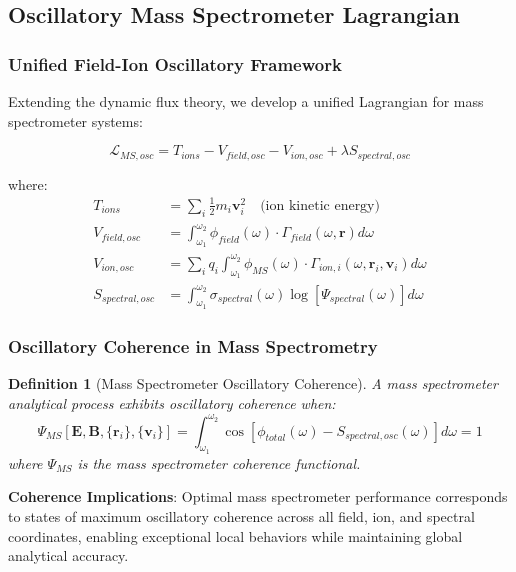 \documentclass[11pt,a4paper]{article}
\newtheorem{definition}[theorem]{Definition}
\theoremstyle{remark}
\begin{document}
\subsection{Oscillatory Mass Spectrometer Lagrangian}

\subsubsection{Unified Field-Ion Oscillatory Framework}

Extending the dynamic flux theory, we develop a unified Lagrangian for mass spectrometer systems:

\begin{equation}
\mathcal{L}_{MS,osc} = T_{ions} - V_{field,osc} - V_{ion,osc} + \lambda S_{spectral,osc}
\end{equation}

where:
\begin{align}
T_{ions} &= \sum_i \frac{1}{2}m_i \mathbf{v}_i^2 \quad \text{(ion kinetic energy)}\\
V_{field,osc} &= \int_{\omega_1}^{\omega_2} \phi_{field}(\omega) \cdot \Gamma_{field}(\omega, \mathbf{r}) d\omega\\
V_{ion,osc} &= \sum_i q_i \int_{\omega_1}^{\omega_2} \phi_{MS}(\omega) \cdot \Gamma_{ion,i}(\omega, \mathbf{r}_i, \mathbf{v}_i) d\omega\\
S_{spectral,osc} &= \int_{\omega_1}^{\omega_2} \sigma_{spectral}(\omega) \log[\Psi_{spectral}(\omega)] d\omega
\end{align}

\subsubsection{Oscillatory Coherence in Mass Spectrometry}

\begin{definition}[Mass Spectrometer Oscillatory Coherence]
A mass spectrometer analytical process exhibits oscillatory coherence when:
\begin{equation}
\Psi_{MS}[\mathbf{E}, \mathbf{B}, \{\mathbf{r}_i\}, \{\mathbf{v}_i\}] = \int_{\omega_1}^{\omega_2} \cos[\phi_{total}(\omega) - S_{spectral,osc}(\omega)] d\omega = 1
\end{equation}
where $\Psi_{MS}$ is the mass spectrometer coherence functional.
\end{definition}

\textbf{Coherence Implications}: Optimal mass spectrometer performance corresponds to states of maximum oscillatory coherence across all field, ion, and spectral coordinates, enabling exceptional local behaviors while maintaining global analytical accuracy.
\end{document}
